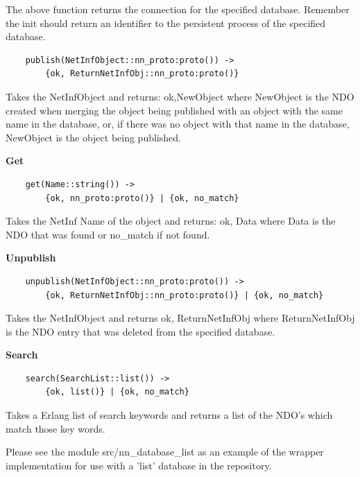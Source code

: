 The above function returns the connection for the specified database.
Remember the init should return an identifier to the persistent process of the specified database.

\begin {verbatim}
    publish(NetInfObject::nn_proto:proto()) -> 
    	{ok, ReturnNetInfObj::nn_proto:proto()}
\end{verbatim}

Takes the NetInfObject and returns: {ok,NewObject} where NewObject is the NDO created when merging the object being published with an object with the same name in the database, or, if there was no object with that name in the database, NewObject is the object being published.

\textbf{Get}

\begin {verbatim}
    get(Name::string()) -> 
    	{ok, nn_proto:proto()} | {ok, no_match}
\end{verbatim}

Takes the NetInf Name of the object and returns: {ok, Data} where Data is the NDO that was found or no\_match if not found.

\textbf{Unpublish}

\begin {verbatim}
    unpublish(NetInfObject::nn_proto:proto()) -> 
    	{ok, ReturnNetInfObj::nn_proto:proto()} | {ok, no_match}
\end{verbatim}

Takes the NetInfObject and returns {ok, ReturnNetInfObj} where ReturnNetInfObj is the NDO entry that was deleted from the specified database.

\textbf{Search}

\begin {verbatim}
    search(SearchList::list()) -> 
    	{ok, list()} | {ok, no_match}
\end{verbatim}

Takes a Erlang list of search keywords and returns a list of the NDO's which match those key words.


Please see the module src/nn\_database\_list as an example of the wrapper implementation for use with a 'list' database in the repository.
